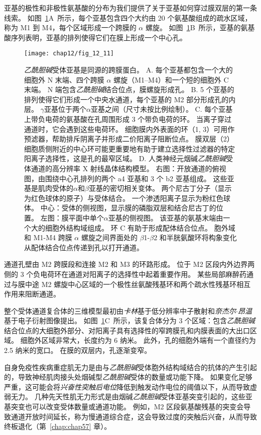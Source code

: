 亚基的极性和非极性氨基酸的分布为我们提供了关于亚基如何穿过膜双层的第一条线索。
如图~\ref{fig:12_11}A~所示，每个亚基包含四个大约由 20 个氨基酸组成的疏水区域，称为 M1 到 M4，每个区域形成一个跨膜的 $\alpha$ 螺旋。
如图~\ref{fig:12_11}B~所示，亚基的氨基酸序列表明，亚基的排列使得它们在膜上形成一个中心孔。


\begin{figure}[htbp]
	\centering
	\texttt{[image: chap12/fig\_12\_11]}
	\caption{\textit{乙酰胆碱}受体亚基是同源的跨膜蛋白。
		A. 每个亚基都包含一个大的细胞外 N 末端、四个跨膜 $\alpha$ 螺旋（M1–M4）和一个短的细胞外 C 末端。
		N 端包含\textit{乙酰胆碱}结合位点，膜螺旋形成孔。
		B. 5 个亚基的排列使得它们形成一个中央水通道，每个亚基的 M2 部分形成孔的内层。
		$\gamma$亚基位于两个$\alpha$亚基之间（尺寸未按比例绘制）。
		C. 每个亚基上带负电荷的氨基酸在孔周围形成 3 个带负电荷的环。
		当离子穿过通道时，它会遇到这些电荷环。
		细胞膜内外表面的环（1, 3）可用作预滤器，帮助排斥阴离子并形成二价阳离子阻断位点。
		膜双层（2）细胞质侧附近的中心环可能更重要地有助于建立选择性过滤器的特定阳离子选择性，这是孔的最窄区域。
		D. 人类神经元烟碱\textit{乙酰胆碱}受体通道的高分辨率 X 射线晶体结构模型。
		右图：开放通道的俯视图，由围绕中心孔排列的两个 a4 亚基和 3 个 b2 亚基组成。
		这些亚基是肌肉受体的$\alpha$和$\beta$亚基的密切相关变体。
		两个尼古丁分子（显示为红色球体的原子）与受体结合。
		一个渗透阳离子显示为粉红色球体。
		中心：受体的侧视图，显示膜的磷脂双层和结合尼古丁的位置。
		左图：膜平面中单个$\alpha$亚基的侧视图。
		该亚基的氨基末端由一个大的细胞外结构域组成。
		环 C 有助于形成配体结合位点。
		胞外域和 M1-M4 跨膜 $\alpha$ 螺旋之间界面处的 $\beta$1-$\beta$2 和半胱氨酸环将构象变化从配体结合位点传递到孔以打开通道\cite{morales2016x}。}
	\label{fig:12_11}
\end{figure}


通道孔壁由 M2 跨膜段和连接 M2 和 M3 的环路形成。
位于 M2 区段内外边界两侧的 3 个负电荷环在通道对阳离子的选择性中起着重要作用。
某些局部麻醉药通过与膜中途 M2 螺旋中心区域的一个极性丝氨酸残基环和两个疏水性残基环相互作用来阻断通道。


整个受体通道复合体的三维模型最初由\textit{卡林}基于低分辨率中子散射和\textit{奈杰尔$\cdot$昂温}基于电子衍射图像提出。
如图~\ref{fig:12_11}C~所示，该复合体分为 3 个区域：包含\textit{乙酰胆碱}结合位点的大细胞外部分、对阳离子具有选择性的窄跨膜孔和内膜表面的大出口区域。
细胞外区域非常大，长度约为 6 纳米。
此外，孔的细胞外端有一个直径约为 2.5 纳米的宽口。
在膜的双层内，孔逐渐变窄。


自身免疫性疾病重症肌无力是由与\textit{乙酰胆碱}受体胞外结构域结合的抗体的产生引起的，导致神经肌肉接头处烟碱型\textit{乙酰胆碱}受体的数量或功能下降。
如果变化足够严重，这可能会将\textit{兴奋性突触后电位}降低到触发动作电位的阈值以下，从而导致虚弱无力。
几种先天性肌无力形式是由烟碱\textit{乙酰胆碱}受体亚基突变引起的，这些亚基突变也可以改变受体数量或通道功能。
例如，M2 区段氨基酸残基的突变会导致通道开放时间延长，称为慢通道综合症，这会导致过度的突触后兴奋，从而导致终板退化（第~\ref{chap:chap57} 章）。



